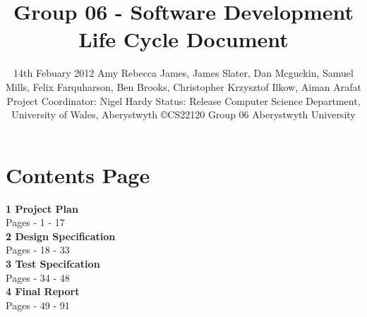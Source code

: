 \documentclass[titlepage]{article}
\title{Group 06 - Software Development Life Cycle Document}
\date{14th Febuary 2012 \linebreak Amy Rebecca James, James Slater, Dan Mcguckin, Samuel Mills, Felix Farquharson, \linebreak Ben Brooks, Christopher Krzysztof Ilkow, Aiman Arafat \linebreak Project Coordinator: Nigel Hardy \linebreak Status: Release \linebreak Computer Science Department, University of Wales, Aberystwyth \linebreak \copyright   CS22120 Group 06 Aberystwyth University}
\begin{document}
\maketitle
\newpage
\thispagestyle{empty}
\pagestyle{empty}
\section {Contents Page}
{\bf 1 Project Plan} \newline
\\
\indent Pages - 1 - 17
\newline
\\
{\bf 2 Design Specification}\newline
\\
\indent Pages - 18 - 33
\newline
\\
{\bf 3 Test Specifcation}\newline
\\
\indent Pages - 34 - 48
\newline
\\
{\bf 4 Final Report}\newline
\\
\indent Pages - 49 - 91
\\
\end{document}
